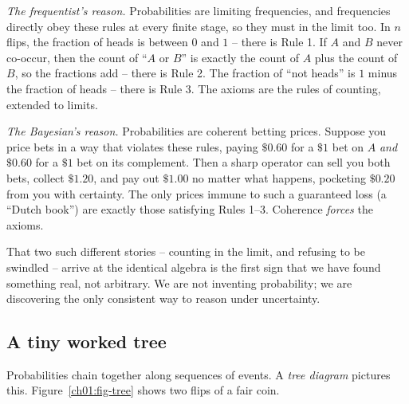 \begin{whybox}
\emph{The frequentist's reason.} Probabilities are limiting frequencies, and
frequencies directly obey these rules at every finite stage, so they must in the
limit too. In $n$ flips, the fraction of heads is between $0$ and $1$ -- there is
Rule 1. If $A$ and $B$ never co-occur, then the count of ``$A$ or $B$'' is exactly
the count of $A$ plus the count of $B$, so the fractions add -- there is Rule 2.
The fraction of ``not heads'' is $1$ minus the fraction of heads -- there is
Rule 3. The axioms are the rules of counting, extended to limits.

\emph{The Bayesian's reason.} Probabilities are coherent betting prices. Suppose
you price bets in a way that violates these rules, paying $\$0.60$ for a $\$1$
bet on $A$ \emph{and} $\$0.60$ for a $\$1$ bet on its complement. Then a sharp
operator can sell you both bets, collect $\$1.20$, and pay out $\$1.00$ no
matter what happens, pocketing $\$0.20$ from you with certainty. The only prices immune to such a
guaranteed loss (a ``Dutch book'') are exactly those satisfying Rules 1--3. Coherence
\emph{forces} the axioms.
\end{whybox}

That two such different stories -- counting in the limit, and refusing to be
swindled -- arrive at the identical algebra is the first sign that we have found
something real, not arbitrary. We are not inventing probability; we are
discovering the only consistent way to reason under uncertainty.

\subsection{A tiny worked tree}
\label{ch01:tree}

Probabilities chain together along sequences of events. A \emph{tree diagram} pictures this.
Figure~\ref{ch01:fig-tree} shows two flips of a fair coin.

